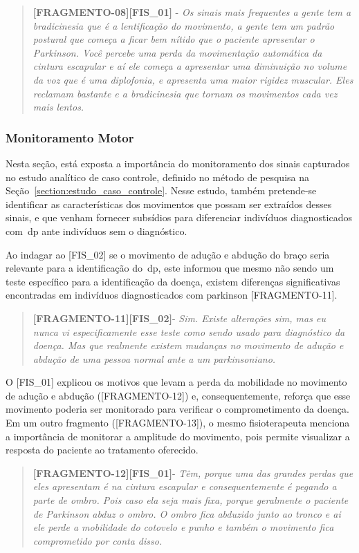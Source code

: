 \begin{quote}
\textbf{[FRAGMENTO-08][FIS\_01]} - 
\emph{
Os sinais mais frequentes a gente tem a bradicinesia que é a lentificação do movimento, a gente tem um padrão postural que começa a ficar bem nítido que o paciente apresentar o Parkinson. Você percebe uma perda da movimentação automática da cintura escapular e aí ele começa a apresentar uma diminuição no volume da voz que é uma diplofonia, e apresenta uma maior rigidez muscular. Eles reclamam bastante e a bradicinesia que tornam os movimentos cada vez mais lentos.
}
\end{quote}




\subsubsection{Monitoramento Motor}
Nesta seção, está exposta a importância do monitoramento dos sinais capturados no estudo analítico de caso controle, definido no método de pesquisa na Seção~\ref{section:estudo_caso_controle}. Nesse estudo, também pretende-se identificar as características dos movimentos que possam ser extraídos desses sinais, e que venham fornecer subsídios para diferenciar indivíduos diagnosticados com~\ac{dp} ante indivíduos sem o diagnóstico.

Ao indagar ao [FIS\_02] se o movimento de adução e abdução do braço seria relevante para a identificação do~\ac{dp}, este informou que mesmo não sendo um teste específico para a identificação da doença, existem diferenças significativas encontradas em indivíduos diagnosticados com parkinson [FRAGMENTO-11].
\begin{quote}
\textbf{[FRAGMENTO-11][FIS\_02]}-
\emph{
Sim. Existe alterações sim, mas eu nunca vi especificamente esse teste como sendo usado para diagnóstico da doença. Mas que realmente existem mudanças no movimento de adução e abdução de uma pessoa normal ante a um parkinsoniano.
}
\end{quote}

O [FIS\_01] explicou os motivos que levam a perda da mobilidade no movimento de adução e abdução ([FRAGMENTO-12]) e, consequentemente, reforça que esse movimento poderia ser monitorado para verificar o comprometimento da doença. Em um outro fragmento ([FRAGMENTO-13]), o mesmo fisioterapeuta menciona a importância de monitorar a amplitude do movimento, pois permite visualizar a resposta do paciente ao tratamento oferecido.

\begin{quote}
\textbf{[FRAGMENTO-12][FIS\_01]}-
\emph{
Têm, porque uma das grandes perdas que eles apresentam é na cintura escapular e consequentemente é pegando a parte de ombro. Pois caso ela seja mais fixa, porque geralmente o paciente de Parkinson abduz o ombro. O ombro fica abduzido junto ao tronco e ai ele perde a mobilidade do cotovelo e punho e também o movimento fica comprometido por conta disso.
}
\end{quote}

